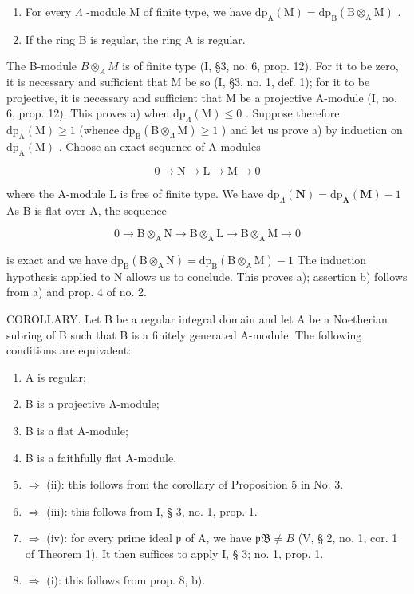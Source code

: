 \begin{enumerate}
\def\labelenumi{\alph{enumi})}
\item
  For every \(\Lambda\) -module M of finite type, we have \(\mathrm{dp}_{\mathrm{A}}(\mathrm{M}) = \mathrm{dp}_{\mathrm{B}}(\mathrm{B} \otimes_{\mathrm{A}} \mathrm{M})\) .
\item
  If the ring B is regular, the ring A is regular.
\end{enumerate}

The B-module \(B \otimes_{A} M\) is of finite type (I, §3, no. 6, prop. 12). For it to be zero, it is necessary and sufficient that M be so (I, §3, no. 1, def. 1); for it to be projective, it is necessary and sufficient that M be a projective A-module (I, no. 6, prop. 12). This proves a) when \(\mathrm{dp}_{\Lambda}(\mathrm{M}) \leqslant 0\) . Suppose therefore \(\mathrm{dp}_{\mathrm{A}}(\mathrm{M}) \geqslant 1\) (whence \(\mathrm{dp}_{\mathrm{B}}(\mathrm{B} \otimes_{\Lambda} \mathrm{M}) \geqslant 1\) ) and let us prove a) by induction on \(\mathrm{dp}_{\mathrm{A}}(\mathrm{M})\) . Choose an exact sequence of A-modules

\[
0 \to \mathrm{N} \to \mathrm{L} \to \mathrm{M} \to 0
\]

where the A-module L is free of finite type. We have \(\mathrm{dp}_{\Lambda}(\mathbf{N}) = \mathrm{dp}_{\mathbf{A}}(\mathbf{M}) - 1\) As B is flat over A, the sequence

\[
0 \rightarrow \mathrm{B} \otimes_ {\mathrm{A}} \mathrm{N} \rightarrow \mathrm{B} \otimes_ {\mathrm{A}} \mathrm{L} \rightarrow \mathrm{B} \otimes_ {\mathrm{A}} \mathrm{M} \rightarrow 0
\]

is exact and we have \(\mathrm{dp}_{\mathrm{B}}(\mathrm{B}\otimes_{\mathrm{A}}\mathrm{N}) = \mathrm{dp}_{\mathrm{B}}(\mathrm{B}\otimes_{\mathrm{A}}\mathrm{M}) - 1\) The induction hypothesis applied to N allows us to conclude. This proves a); assertion b) follows from a) and prop. 4 of no. 2.

COROLLARY. Let B be a regular integral domain and let A be a Noetherian subring of B such that B is a finitely generated A-module. The following conditions are equivalent:

\begin{enumerate}
\def\labelenumi{(\roman{enumi})}
\item
  A is regular;
\item
  B is a projective Λ-module;
\item
  B is a flat A-module;
\item
  B is a faithfully flat A-module.
\item
  \(\Rightarrow\) (ii): this follows from the corollary of Proposition 5 in No. 3.
\item
  \(\Rightarrow\) (iii): this follows from I, § 3, no. 1, prop. 1.
\item
  \(\Rightarrow\) (iv): for every prime ideal \(\mathfrak{p}\) of A, we have \(\mathfrak{pB} \neq B\) (V, § 2, no. 1, cor. 1 of Theorem 1). It then suffices to apply I, § 3; no. 1, prop. 1.
\item
  \(\Rightarrow\) (i): this follows from prop. 8, b).
\end{enumerate}

